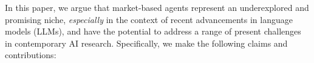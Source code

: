 

In this paper, we argue that market-based agents represent an underexplored and promising niche, \emph{especially} in the context of recent advancements in language models (LLMs), and have the potential to address a range of present challenges in contemporary AI research. Specifically, we make the following claims and contributions:

